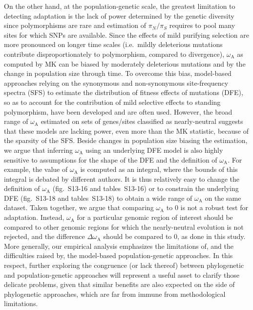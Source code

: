 \documentclass{article}
\newcommand{\rateApop}{\omega_{\mathrm{A}}}
\newcommand{\pn}{\pi_N}
\newcommand{\ps}{\pi_S}
\newcommand{\pnps}{\pn / \ps}
\begin{document}
    On the other hand, at the population-genetic scale, the greatest limitation to detecting adaptation is the lack of power determined by the genetic diversity since polymorphisms are rare and estimation of $\pnps$ requires to pool many sites for which SNPs are available.
    Since the effects of mild purifying selection are more pronounced on longer time scales (i.e.~mildly deleterious mutations contribute disproportionately to polymorphism, compared to divergence), $\rateApop$ as computed by MK can be biased by moderately deleterious mutations\cite{eyre-walker_quantifying_2002, ho_time_2005} and by the change in population size through time\cite{eyre-walker_changing_2002}.
    To overcome this bias, model-based approaches relying on the synonymous and non-synonymous site-frequency spectra (SFS) to estimate the distribution of fitness effects of mutations (DFE), so as to account for the contribution of mild selective effects to standing polymorphism, have been developed\cite{eyre-walker_estimating_2009, tataru_polydfe_2020} and are often used\cite{galtier_adaptive_2016, moutinho_variation_2019}.
    However, the broad range of $\rateApop$ estimated on sets of genes/sites classified as nearly-neutral suggests that these models are lacking power, even more than the MK statistic, because of the sparsity of the SFS.
    Beside changes in population size biasing the estimation\cite{rousselle_overestimation_2018}, we argue that inferring $\rateApop$ using an underlying DFE model is also highly sensitive to assumptions for the shape of the DFE and the definition of $\rateApop$.
    For example, the value of $\rateApop$ is computed as an integral, where the bounds of this integral is debated by different authors\cite{galtier_adaptive_2016, tataru_polydfev2_2019}.
    It is thus relatively easy to change the definition of $\rateApop$ (fig.~S13-16 and tables~S13-16) or to constrain the underlying DFE (fig.~S13-18 and tables~S13-18) to obtain a wide range of $\rateApop$ on the same dataset.
    Taken together, we argue that comparing $\rateApop$ to 0 is not a robust test for adaptation.
    Instead, $\rateApop$ for a particular genomic region of interest should be compared to other genomic regions for which the nearly-neutral evolution is not rejected, and the difference $\Delta \rateApop$ should be compared to 0, as done in this study.
    More generally, our empirical analysis emphasizes the limitations of, and the difficulties raised by, the model-based population-genetic approaches.
    In this respect, further exploring the congruence (or lack thereof) between phylogenetic and population-genetic approaches will represent a useful asset to clarify those delicate problems, given that similar benefits are also expected on the side of phylogenetic approaches, which are far from immune from methodological limitations.
\end{document}
